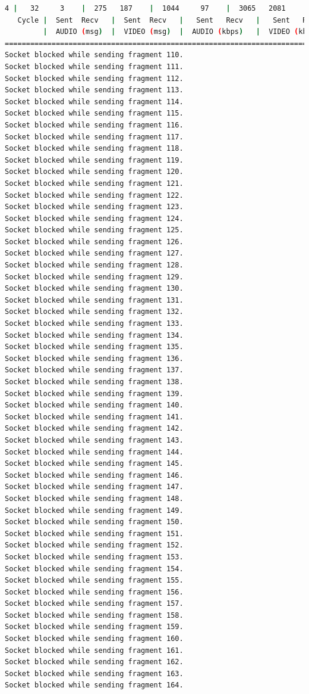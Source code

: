 \begin{lstlisting}[language=bash,basicstyle=\ttfamily\tiny]
       4 |   32     3    |  275   187    |  1044     97    |  3065   2081    |  43     73       
   Cycle |  Sent  Recv   |  Sent  Recv   |   Sent   Recv   |   Sent   Recv   | Program System
         |  AUDIO (msg)  |  VIDEO (msg)  |  AUDIO (kbps)   |  VIDEO (kbps)   |     CPU (%) 
===========================================================================================
Socket blocked while sending fragment 110.
Socket blocked while sending fragment 111.
Socket blocked while sending fragment 112.
Socket blocked while sending fragment 113.
Socket blocked while sending fragment 114.
Socket blocked while sending fragment 115.
Socket blocked while sending fragment 116.
Socket blocked while sending fragment 117.
Socket blocked while sending fragment 118.
Socket blocked while sending fragment 119.
Socket blocked while sending fragment 120.
Socket blocked while sending fragment 121.
Socket blocked while sending fragment 122.
Socket blocked while sending fragment 123.
Socket blocked while sending fragment 124.
Socket blocked while sending fragment 125.
Socket blocked while sending fragment 126.
Socket blocked while sending fragment 127.
Socket blocked while sending fragment 128.
Socket blocked while sending fragment 129.
Socket blocked while sending fragment 130.
Socket blocked while sending fragment 131.
Socket blocked while sending fragment 132.
Socket blocked while sending fragment 133.
Socket blocked while sending fragment 134.
Socket blocked while sending fragment 135.
Socket blocked while sending fragment 136.
Socket blocked while sending fragment 137.
Socket blocked while sending fragment 138.
Socket blocked while sending fragment 139.
Socket blocked while sending fragment 140.
Socket blocked while sending fragment 141.
Socket blocked while sending fragment 142.
Socket blocked while sending fragment 143.
Socket blocked while sending fragment 144.
Socket blocked while sending fragment 145.
Socket blocked while sending fragment 146.
Socket blocked while sending fragment 147.
Socket blocked while sending fragment 148.
Socket blocked while sending fragment 149.
Socket blocked while sending fragment 150.
Socket blocked while sending fragment 151.
Socket blocked while sending fragment 152.
Socket blocked while sending fragment 153.
Socket blocked while sending fragment 154.
Socket blocked while sending fragment 155.
Socket blocked while sending fragment 156.
Socket blocked while sending fragment 157.
Socket blocked while sending fragment 158.
Socket blocked while sending fragment 159.
Socket blocked while sending fragment 160.
Socket blocked while sending fragment 161.
Socket blocked while sending fragment 162.
Socket blocked while sending fragment 163.
Socket blocked while sending fragment 164.


\end{lstlisting}
